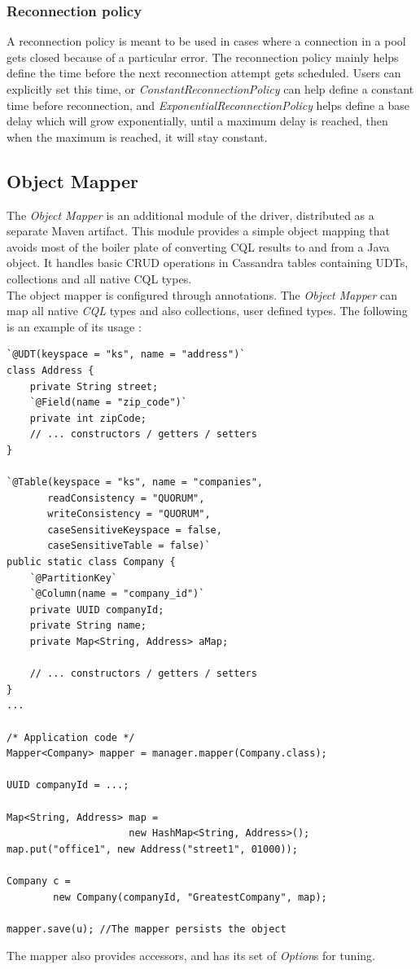 \documentclass[a4paper]{report}
\newcommand{\om}{\emph{Object Mapper\xspace}}
\begin{document}
\subsubsection{Reconnection policy}
A reconnection policy is meant to be used in cases where a connection in a pool gets closed because of a particular error. The reconnection policy mainly helps define the time before the next reconnection attempt gets scheduled. Users can explicitly set this time, or \emph{ConstantReconnectionPolicy} can help define a constant time before reconnection, and \emph{ExponentialReconnectionPolicy} helps define a base delay which will grow exponentially, until a maximum delay is reached, then when the maximum is reached, it will stay constant.

\subsection{Object Mapper}
The \om{} is an additional module of the driver, distributed as a separate Maven artifact. This module provides a simple object mapping that avoids most of the boiler plate of converting CQL results to and from a Java object. It handles basic CRUD operations in Cassandra tables containing UDTs, collections and all native CQL types.\\
The object mapper is configured through annotations. The \om{} can map all native \emph{CQL} types and also collections, user defined types. The following is an example of its usage : 

\begin{lstlisting}[label=om-ex-1, caption=Object Mapper example, style=Java]
`@UDT(keyspace = "ks", name = "address")`
class Address {
    private String street;
    `@Field(name = "zip_code")`
    private int zipCode;
    // ... constructors / getters / setters
}

`@Table(keyspace = "ks", name = "companies",
       readConsistency = "QUORUM",
       writeConsistency = "QUORUM",
       caseSensitiveKeyspace = false,
       caseSensitiveTable = false)`
public static class Company {
    `@PartitionKey`
    `@Column(name = "company_id")`
    private UUID companyId;
    private String name;
    private Map<String, Address> aMap;

    // ... constructors / getters / setters
}
...

/* Application code */
Mapper<Company> mapper = manager.mapper(Company.class);

UUID companyId = ...;

Map<String, Address> map = 
                     new HashMap<String, Address>();
map.put("office1", new Address("street1", 01000));

Company c = 
        new Company(companyId, "GreatestCompany", map);

mapper.save(u); //The mapper persists the object
\end{lstlisting}
The mapper also provides accessors, and has its set of \emph{Option}s for tuning.
\end{document}
